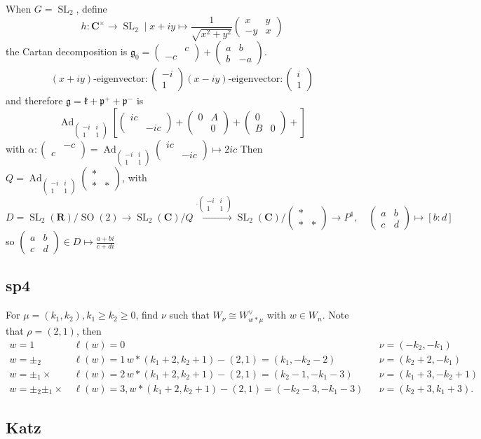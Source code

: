 \documentclass[leqno]{amsart}
\newcommand{\smat}[1]{\left( \begin{smallmatrix} #1 \end{smallmatrix} \right)}
\DeclareMathOperator{\SL}{SL}
\DeclareMathOperator{\SO}{SO}
\DeclareMathOperator{\Ad}{Ad}
\newcommand{\R}{\mathbf R}
\newcommand{\C}{\mathbf C}
\newcommand{\1}{\mathbf{1}}
\newcommand{\rfg}{\mathfrak{g}_0}
\newcommand{\cfg}{\mathfrak{g}}
\newcommand{\cfk}{\mathfrak{k}}
\newcommand{\cfp}{\mathfrak{p}}
\theoremstyle{definition}
\theoremstyle{remark}
\begin{document}
When $G=\SL_2$, define
 \[
	h\colon \C^\times\to \SL_2\mid
	x+iy\mapsto
	\frac{1}{\sqrt{x^2+y^2}}
	\smat{x&y\\-y&x}
\]
the Cartan decomposition is 
$\rfg=\smat{&c\\-c&}+\smat{a&b\\b&-a}$.
\begin{gather*}
	(x+iy)\text{-eigenvector}\colon
	\smat{-i\\1}
	(x-iy)\text{-eigenvector}\colon
	\smat{i\\1}
\end{gather*}
and therefore $\cfg=\cfk+\cfp^++\cfp^-$ is
\[
	\Ad_{\smat{-i&i\\1&1}}
	\left[
	\smat{ic&\\&-ic}+
	\smat{0&A\\&0}+
	\smat{0&\\B&0}+
	\right]
\]
with $\alpha\colon \smat{&-c\\c&}=
	\Ad_{\smat{-i&i\\1&1}}\smat{ic&\\&-ic}
	\mapsto 2ic $ 
	Then  $Q=\Ad_{\smat{-i&i\\1&1}}\smat{*&\\*&*}$, with
\[
	D=
	\SL_2(\R)/\SO(2)\to
	\SL_2(\C)/Q
	\xrightarrow{\cdot\smat{-i&i\\1&1}}
	\SL_2(\C)/\smat{*&\\*&*}\to
	P^1,\quad
	\smat{a&b\\c&d}\mapsto [b:d]
\]
	so $\smat{a&b\\c&d}\in D\mapsto 
	\frac{a+bi}{c+di}$

\subsection{sp4}

For $\mu=(k_1,k_2), k_1\geq k_2\geq 0$,
find  $\nu$
such that  $W_\nu\cong W_{w*\mu}^\vee$
with $w\in W_n$.
Note that  $\rho=(2,1)$,
then 
 \begin{align*}
	 w=1\,&\ell(w)=0 & &\nu=(-k_2,-k_1)\\
	 w=\pm_2\,& \ell(w)=1\,
	 w*(k_1+2,k_2+1)-(2,1)
	 =(k_1,-k_2-2) & & \nu=(k_2+2,-k_1)\\
	 w=\pm_1\times\,& \ell(w)=2\,
	 w*(k_1+2,k_2+1)-(2,1)
	 =(k_2-1,-k_1-3) & & \nu=(k_1+3,-k_2+1)\\
	 w=\pm_2\pm_1\times\, & \ell(w)=3,
	 w*(k_1+2,k_2+1)-(2,1)
	 =(-k_2-3,-k_1-3) & & \nu=(k_2+3,k_1+3).
\end{align*}

\subsection{Katz}
\end{document}
